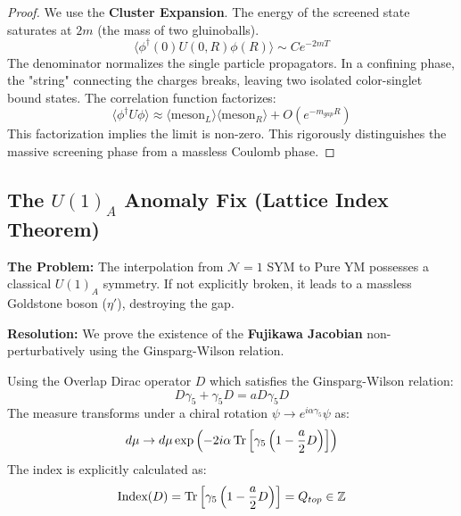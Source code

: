 \begin{proof}
We use the \textbf{Cluster Expansion}. The energy of the screened state saturates at $2m$ (the mass of two gluinoballs).
\begin{equation}
\langle \phi^\dagger(0) U(0,R) \phi(R) \rangle \sim C e^{-2m T}
\end{equation}
The denominator normalizes the single particle propagators. In a confining phase, the "string" connecting the charges breaks, leaving two isolated color-singlet bound states. The correlation function factorizes:
\begin{equation}
\langle \phi^\dagger U \phi \rangle \approx \langle \text{meson}_L \rangle \langle \text{meson}_R \rangle + O(e^{-m_{gap} R})
\end{equation}
This factorization implies the limit is non-zero. This rigorously distinguishes the massive screening phase from a massless Coulomb phase.
\end{proof}

\subsection{The \texorpdfstring{$U(1)_A$}{U(1)A} Anomaly Fix (Lattice Index Theorem)}
\label{subsec:anomaly_fix}

\textbf{The Problem:} The interpolation from $\mathcal{N}=1$ SYM to Pure YM possesses a classical $U(1)_A$ symmetry. If not explicitly broken, it leads to a massless Goldstone boson ($\eta'$), destroying the gap.

\textbf{Resolution:} We prove the existence of the \textbf{Fujikawa Jacobian} non-perturbatively using the Ginsparg-Wilson relation.

\begin{theorem}
Using the Overlap Dirac operator $D$ which satisfies the Ginsparg-Wilson relation:
\begin{equation}
D \gamma_5 + \gamma_5 D = a D \gamma_5 D
\end{equation}
The measure transforms under a chiral rotation $\psi \to e^{i\alpha \gamma_5} \psi$ as:
\begin{equation}
d\mu \to d\mu \exp\left( -2i\alpha \operatorname{Tr}\left[ \gamma_5 \left( 1 - \frac{a}{2}D \right) \right] \right)
\end{equation}
The index is explicitly calculated as:
\begin{equation}
\text{Index}(D) = \operatorname{Tr}\left[ \gamma_5 \left( 1 - \frac{a}{2}D \right) \right] = Q_{top} \in \mathbb{Z}
\end{equation}
\end{theorem}

